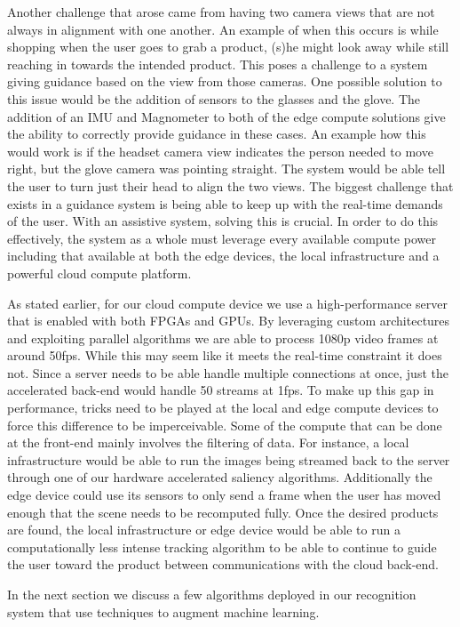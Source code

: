 Another challenge that arose came from having two camera views that are not always in alignment with one another. An example of when this occurs is 
while shopping when the user goes to grab a product, (s)he might look away while still reaching in towards the intended product. 
This poses a challenge to a system giving guidance based on the view from those cameras. One possible solution to this issue would be the addition of sensors 
to the glasses and the glove. The addition of an IMU and Magnometer to both of the edge compute solutions give the ability to correctly provide guidance in these cases. 
An example how this would work is if the headset camera view indicates the person needed to move right, 
but the glove camera was pointing straight. The system would be able tell the user to turn just their head to align the two views.
The biggest challenge that exists in a guidance system is being able to keep up with the real-time demands of the user. With an assistive system, 
solving this is crucial. In order to do this effectively, the system as a whole must leverage every available compute power 
including that available at both the edge devices, the local infrastructure and a powerful cloud compute platform. 

As stated earlier, for our cloud compute device we use a high-performance server that is enabled with both FPGAs and GPUs. 
By leveraging custom architectures and exploiting parallel algorithms we are able to process 1080p video frames at around 50fps. 
While this may seem like it meets the real-time constraint it does not. Since a server needs to be able handle multiple connections at once, 
just the accelerated back-end would handle 50 streams at 1fps. To make up this gap in performance, 
tricks need to be played at the local and edge compute devices to force this difference to be imperceivable. 
Some of the compute that can be done at the front-end mainly involves the filtering of data. For instance, a local infrastructure would be able to run the 
images being streamed back to the server through one of our hardware accelerated saliency algorithms. Additionally the edge device 
could use its sensors to only send a frame when the user has moved enough that the scene needs to be recomputed fully. 
Once the desired products are found, the local infrastructure or edge device would be able to run a computationally less intense tracking 
algorithm to be able to continue to guide the user toward the product between communications with the cloud back-end.

In the next section we discuss a few algorithms deployed in our recognition system that use techniques to augment machine learning. 

